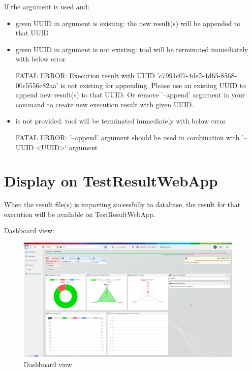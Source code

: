 If the argument  is used and:
\begin{itemize}
  \item given UUID in  argument is existing: the new result(s) will be appended to that UUID
  \item given UUID in  argument is not existing: tool will be terminated immediately with below error
\begin{robotlog}
FATAL ERROR: Execution result with UUID 'c7991c07-4de2-4d65-8568-00c5556c82aa' is not existing for appending.
             Please use an existing UUID to append new result(s) to that UUID.
             Or remove '--append' argument in your command to create new execution result with given UUID.
\end{robotlog}
  \item {} is not provided: tool will be terminated immediately with below error
\begin{robotlog}
FATAL ERROR: '--append' argument should be used in combination with '--UUID <UUID>` argument
\end{robotlog}
\end{itemize} 


\newpage
\hypertarget{display-on-testresultwebapp}{%
\section{Display on
TestResultWebApp}\label{display-on-testresultwebapp}}

When the result file(s) is importing sucessfully to database, the result
for that execution will be available on TestResultWebApp.

Dashboard view:

\begin{figure}[h!]
  \includegraphics[width=1\linewidth]{./pictures/Dashboard.png}
  \caption{Dashboard view}
\end{figure}


